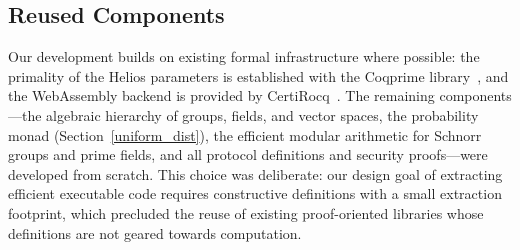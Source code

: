 \subsection{Reused Components}\label{reused_comp}
Our development builds on existing formal infrastructure where possible: the primality of the Helios parameters is established with the Coqprime library~\cite{thery2007primality}, and the WebAssembly backend is provided by CertiRocq~\cite{anand2017certicoq,meier2025certicoq}. The remaining components---the algebraic hierarchy of groups, fields, and vector spaces, the probability monad (Section~\ref{uniform_dist}), the efficient modular arithmetic for Schnorr groups and prime fields, and all protocol definitions and security proofs---were developed from scratch. This choice was deliberate: our design goal of extracting efficient executable code requires constructive definitions with a small extraction footprint, which precluded the reuse of existing proof-oriented libraries whose definitions are not geared towards computation.

